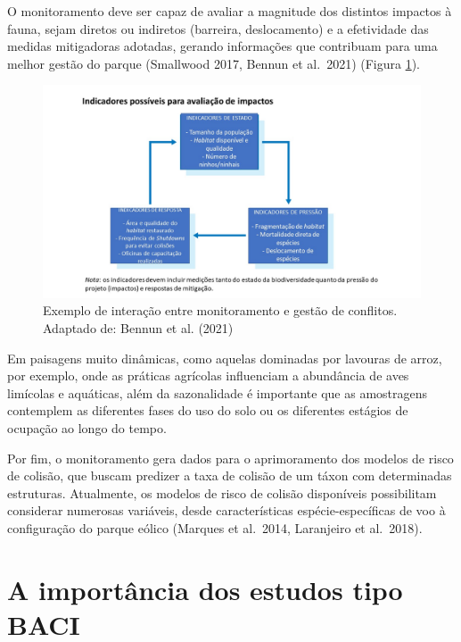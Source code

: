 \documentclass[
  oneside]{scrbook}
\begin{document}
O monitoramento deve ser capaz de avaliar a magnitude dos distintos impactos à fauna, sejam diretos ou indiretos (barreira, deslocamento) e a efetividade das medidas mitigadoras adotadas, gerando informações que contribuam para uma melhor gestão do parque (Smallwood 2017, Bennun et al.~2021) (Figura \ref{fig:19}).

\begin{figure}

{\centering \includegraphics[width=0.85\linewidth]{imagens/cap06/Figura_6.2} 

}

\caption{Exemplo de interação entre monitoramento e gestão de conflitos. Adaptado de: Bennun et al. (2021)}\label{fig:19}
\end{figure}

Em paisagens muito dinâmicas, como aquelas dominadas por lavouras de arroz, por exemplo, onde as práticas agrícolas influenciam a abundância de aves limícolas e aquáticas, além da sazonalidade é importante que as amostragens contemplem as diferentes fases do uso do solo ou os diferentes estágios de ocupação ao longo do tempo.

Por fim, o monitoramento gera dados para o aprimoramento dos modelos de risco de colisão, que buscam predizer a taxa de colisão de um táxon com determinadas estruturas. Atualmente, os modelos de risco de colisão disponíveis possibilitam considerar numerosas variáveis, desde características espécie-específicas de voo à configuração do parque eólico (Marques et al.~2014, Laranjeiro et al.~2018).

\hypertarget{a-importuxe2ncia-dos-estudos-tipo-baci}{%
\section{A importância dos estudos tipo BACI}\label{a-importuxe2ncia-dos-estudos-tipo-baci}}
\end{document}

